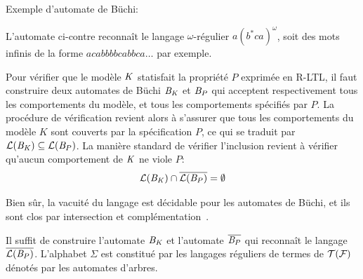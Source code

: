 \begin{example}
  Exemple d'automate de Büchi:\\

  \begin{center}
  \end{center}
  L'automate ci-contre reconnaît le langage $\omega$-régulier $a(b^*ca)^\omega$,
  soit des mots infinis de la forme $acabbbbcabbca\dots$ par exemple.
\end{example}



Pour vérifier que le modèle $\mathit K$ statisfait la propriété $P$ exprimée en R-LTL, 
il faut construire deux automates de Büchi $\mathit B_\mathit K$ et $\mathit B_P$ qui acceptent respectivement
tous les comportements du modèle, et tous les comportements spécifiés par $P$.
La procédure de vérification revient alors à s'assurer que tous les comportements du modèle
$K$ sont couverts par la spécification $P$, ce qui se traduit par $\mathcal{L}(\mathit B_\mathit K) \subseteq \mathcal{L}(\mathit B_P)$.
La manière standard de vérifier l'inclusion revient à vérifier qu'aucun comportement de
$\mathit K$ ne viole $P$:
\[ \mathcal{L}(\mathit B_\mathit K) \cap \overline{\mathcal{L}(\mathit B_P)} = \emptyset \]

Bien sûr, la vacuité du langage est décidable pour les automates de
Büchi, et ils sont clos par intersection et complémentation~\cite{Buchi}.

Il suffit de construire l'automate $\mathit B_\mathit K$ et l'automate $\overline{\mathit B_P}$ qui reconnaît le langage $\overline{\mathcal{L}(\mathit B_P)}$.
L'alphabet $\Sigma$ est constitué par les langages réguliers de termes de $\mathcal{T(F)}$ dénotés par les 
automates d'arbres.

